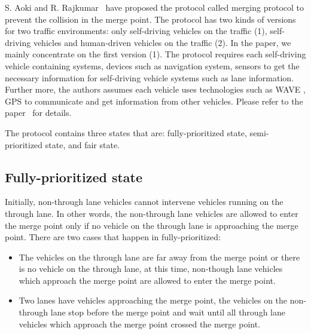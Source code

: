\documentclass[10pt, conference, compsocconf]{IEEEtran}
\begin{document}
S. Aoki and R. Rajkumar~\cite{10.1145/3055004.3055028} have proposed the protocol called merging protocol to prevent the collision in the merge point.
The protocol has two kinds of versions for two traffic environments: only self-driving vehicles on the traffic (1), self-driving vehicles and human-driven vehicles on the traffic (2).
In the paper, we mainly concentrate on the first version (1). 
The protocol requires each self-driving vehicle containing systems, devices such as navigation system, sensors to get the necessary information for self-driving vehicle systems such as lane information.
Further more, the authors assumes each vehicle uses technologies such as WAVE \cite{4346439,5888501}, GPS to communicate and get information from other vehicles.
Please refer to the paper~\cite{10.1145/3055004.3055028} for details.

The protocol contains three states that are: fully-prioritized state, semi-prioritized state, and fair state.

\subsection{Fully-prioritized state}
Initially, non-through lane vehicles cannot intervene vehicles running on the through lane. 
In other words, the non-through lane vehicles are allowed to enter the merge point only if no vehicle on the through lane is approaching the merge point.
There are two cases that happen in fully-prioritized: 
\begin{itemize}
    \item The vehicles on the through lane are far away from the merge point or there is no vehicle on the through lane, at this time, non-though lane vehicles which approach the merge point are allowed to enter the merge point.
    \item Two lanes have vehicles approaching the merge point, the vehicles on the non-through lane stop before the merge point and wait until all through lane vehicles which approach the merge point crossed the merge point. 
\end{itemize}
\end{document}
